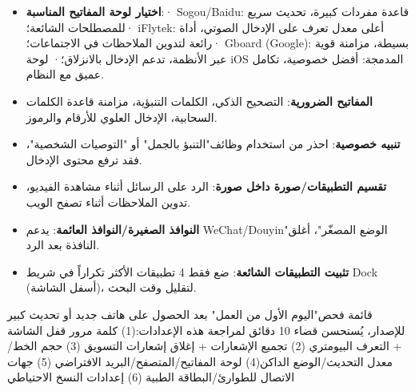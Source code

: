 
\begin{itemize}
  \item \textbf{اختيار لوحة المفاتيح المناسبة}:\newline · Sogou/Baidu: قاعدة مفردات كبيرة، تحديث سريع للمصطلحات الشائعة؛\newline · iFlytek: أعلى معدل تعرف على الإدخال الصوتي، أداة رائعة لتدوين الملاحظات في الاجتماعات؛\newline · Gboard (Google): بسيطة، مزامنة قوية عبر الأنظمة، تدعم الإدخال بالانزلاق؛\newline · لوحة iOS المدمجة: أفضل خصوصية، تكامل عميق مع النظام.
  \item \textbf{المفاتيح الضرورية}: التصحيح الذكي، الكلمات التنبؤية، مزامنة قاعدة الكلمات السحابية، الإدخال العلوي للأرقام والرموز.
  \item \textbf{تنبيه خصوصية}: احذر من استخدام وظائف"التنبؤ بالجمل" أو "التوصيات الشخصية"، فقد ترفع محتوى الإدخال.
\end{itemize}


\begin{itemize}
  \item \textbf{تقسيم التطبيقات/صورة داخل صورة}: الرد على الرسائل أثناء مشاهدة الفيديو، تدوين الملاحظات أثناء تصفح الويب.
  \item \textbf{النوافذ الصغيرة/النوافذ العائمة}: يدعم WeChat/Douyin"الوضع المصغّر"، أغلق النافذة بعد الرد.
  \item \textbf{تثبيت التطبيقات الشائعة}: ضع فقط 4 تطبيقات الأكثر تكراراً في شريط Dock (أسفل الشاشة)، لتقليل وقت البحث.
\end{itemize}

\begin{tcbinfo}{قائمة فحص"اليوم الأول من العمل"}
بعد الحصول على هاتف جديد أو تحديث كبير للإصدار، يُستحسن قضاء 10 دقائق لمراجعة هذه الإعدادات:\newline (1) كلمة مرور قفل الشاشة + التعرف البيومتري (2) تجميع الإشعارات + إغلاق إشعارات التسويق (3) حجم الخط/معدل التحديث/الوضع الداكن\newline (4) لوحة المفاتيح/المتصفح/البريد الافتراضي (5) جهات الاتصال للطوارئ/البطاقة الطبية (6) إعدادات النسخ الاحتياطي

\end{tcbinfo}



